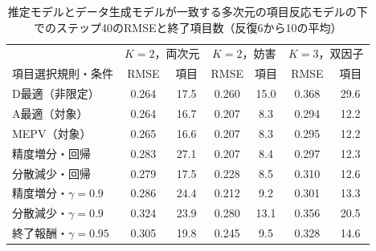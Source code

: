\documentclass[paper]{ieicej}
\begin{document}
\begin{table}[t]
\centering
\caption{推定モデルとデータ生成モデルが一致する多次元の項目反応モデルの下でのステップ40のRMSEと終了項目数（反復6から10の平均）}
\label{tab:app-k}
\scriptsize
\setlength{\tabcolsep}{1.5pt}
\begin{tabular}{@{}lcccccc@{}}
\hline
 & \multicolumn{2}{c}{$K=2$，両次元} & \multicolumn{2}{c}{$K=2$，妨害} & \multicolumn{2}{c}{$K=3$，双因子}\\
項目選択規則・条件 & RMSE & 項目 & RMSE & 項目 & RMSE & 項目\\
\hline
D最適（非限定） & 0.264 & 17.5 & 0.260 & 15.0 & 0.368 & 29.6\\
A最適（対象） & 0.264 & 16.7 & 0.207 & 8.3 & 0.294 & 12.2\\
MEPV（対象） & 0.265 & 16.6 & 0.207 & 8.3 & 0.295 & 12.2\\
精度増分・回帰 & 0.283 & 27.1 & 0.207 & 8.4 & 0.297 & 12.3\\
分散減少・回帰 & 0.279 & 17.5 & 0.228 & 8.5 & 0.310 & 12.6\\
精度増分・$\gamma=0.9$ & 0.286 & 24.4 & 0.212 & 9.2 & 0.301 & 13.3\\
分散減少・$\gamma=0.9$ & 0.324 & 23.9 & 0.280 & 13.1 & 0.356 & 20.5\\
終了報酬・$\gamma=0.95$ & 0.305 & 19.8 & 0.245 & 9.5 & 0.328 & 14.6\\
\hline
\end{tabular}
\end{table}
\end{document}
